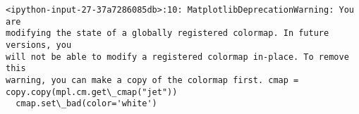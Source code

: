 \documentclass[11pt]{article}
\makeatletter
\newcommand{\boxspacing}{\kern\kvtcb@left@rule\kern\kvtcb@boxsep}
\newcommand{\prompt}[4]{
        {\ttfamily\llap{{\color{#2}[#3]:\hspace{3pt}#4}}\vspace{-\baselineskip}}
    }
\makeatother
\begin{document}
    \begin{Verbatim}[commandchars=\\\{\}]
<ipython-input-27-37a7286085db>:10: MatplotlibDeprecationWarning: You are
modifying the state of a globally registered colormap. In future versions, you
will not be able to modify a registered colormap in-place. To remove this
warning, you can make a copy of the colormap first. cmap =
copy.copy(mpl.cm.get\_cmap("jet"))
  cmap.set\_bad(color='white')
    \end{Verbatim}

    \begin{center}
    \end{center}
    { \hspace*{\fill} \\}
    
    \begin{tcolorbox}[breakable, size=fbox, boxrule=1pt, pad at break*=1mm,colback=cellbackground, colframe=cellborder]
\prompt{In}{incolor}{ }{\boxspacing}
\begin{Verbatim}[commandchars=\\\{\}]

\end{Verbatim}
\end{tcolorbox}


    
    
    
\end{document}
